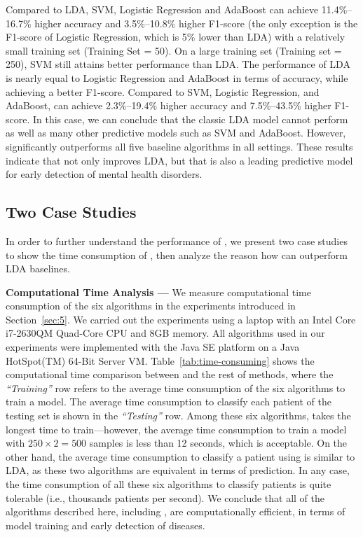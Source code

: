 Compared to LDA, SVM, Logistic Regression and AdaBoost can achieve 11.4\%--16.7\% higher accuracy and 3.5\%--10.8\% higher F1-score (the only exception is the F1-score of Logistic Regression, which is 5\% lower than LDA) with a relatively small training set (Training Set = 50). 
On a large training set (Training set = 250), SVM still attains better performance than LDA.
The performance of LDA is nearly equal to Logistic Regression and AdaBoost in terms of accuracy, while achieving a better F1-score.
Compared to SVM, Logistic Regression, and AdaBoost, \TheName{} can achieve 2.3\%--19.4\% higher accuracy and 7.5\%--43.5\% higher F1-score. 
In this case, we can conclude that the classic LDA model cannot perform as well as many other predictive models such as SVM and AdaBoost. However, \TheName{} significantly outperforms all five baseline algorithms in all settings. 
These results indicate that \TheName{} not only improves LDA, but that \TheName{} is also a leading predictive model for early detection of mental health disorders. 



\subsection{Two Case Studies}
In order to further understand the performance of \TheName{}, we present two case studies to show the time consumption of \TheName{}, then analyze the reason how \TheName{} can outperform LDA baselines.

\textbf{Computational Time Analysis --- } We measure computational time consumption of the six algorithms in the experiments introduced in Section~\ref{sec:5}. We carried out the experiments using a laptop with an Intel Core i7-2630QM Quad-Core CPU and 8GB memory. All algorithms used in our experiments were implemented with the Java SE platform on a Java HotSpot(TM) 64-Bit Server VM.
%
%
Table~\ref{tab:time-consuming} shows the computational time comparison between \TheName{} and the rest of methods, where the \emph{``Training''} row refers to the average time consumption of the six algorithms to train a model.  
The average time consumption to classify each patient of the testing set is shown in the \emph{``Testing''} row. 
Among these six algorithms, \TheName{} takes the longest time to train---however, the average time consumption to train a model with $250\times 2=500$ samples is less than 12 seconds, which is acceptable. 
On the other hand, the average time consumption to classify a patient using \TheName{} is similar to LDA, as these two algorithms are equivalent in terms of prediction. 
In any case, the time consumption of all these six algorithms to classify patients is quite tolerable (i.e., thousands patients per second). 
We conclude that all of the algorithms described here, including \TheName{}, are computationally efficient, in terms of model training and early detection of diseases.


